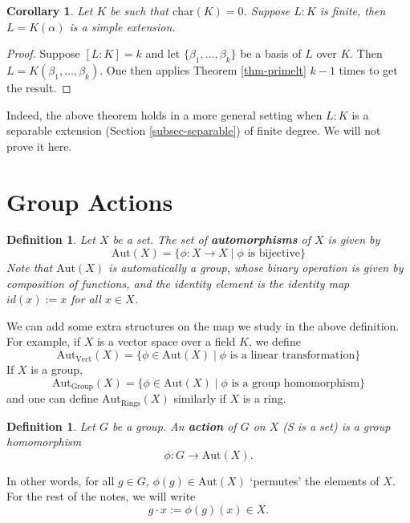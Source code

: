 \documentclass[11pt]{book}
\newtheorem{corollary}[theorem]{Corollary}
\newtheorem{definition}[theorem]{Definition}
\begin{document}
\begin{corollary} \label{cor-primelt}
    Let $K$ be such that $\mathrm{char}(K) = 0$. Suppose $L:K$ is finite, then $L = K(\alpha)$ is a simple extension.
\end{corollary}
\begin{proof}
    Suppose $[L:K] = k$ and let $\{\beta_1, \dots, \beta_k\}$ be a basis of $L$ over $K$. Then $L = K(\beta_1, \dots, \beta_k)$. One then applies Theorem \ref{thm-primelt} $k-1$ times to get the result.
\end{proof}
Indeed, the above theorem holds in a more general setting when $L:K$ is a separable extension (Section \ref{subsec-separable}) of finite degree. We will not prove it here.

\section{Group Actions}
\begin{definition} Let $X$ be a set. The set of \textbf{automorphisms} of $X$ is given by
\[
\mathrm{Aut}(X) = \{\phi : X \to X \mid \phi \text{ is bijective}\}
\]
Note that $\mathrm{Aut}(X)$ is automatically a group, whose binary operation is given by composition of functions, and the identity element is the identity map $id(x) := x$ for all $x \in X$.
\end{definition}

We can add some extra structures on the map we study in the above definition. For example, if
$X$ is a vector space over a field $K$, we define
\[
\mathrm{Aut}_{\mathrm{Vect}}(X) = \{\phi \in \mathrm{Aut}(X) \mid \phi \text{ is a linear transformation}\}
\]
If $X$ is a group,
\[
\mathrm{Aut}_{\mathrm{Group}}(X) = \{\phi \in \mathrm{Aut}(X) \mid \phi \text{ is a group homomorphism}\}
\]
and one can define $\mathrm{Aut}_{\mathrm{Rings}}(X)$ similarly if $X$ is a ring.

\begin{definition} Let $G$ be a group. An \textbf{action} of $G$ on $X$ (S is a set) is a group homomorphism
\[
\phi : G \to \mathrm{Aut}(X).
\]
\end{definition}
In other words, for all $g \in G$, 
$\phi(g) \in \mathrm{Aut}(X)$ `permutes' the elements of $X$.
For the rest of the notes, we will write 
$$g \cdot x := \phi(g)(x) \in X.$$
\end{document}
